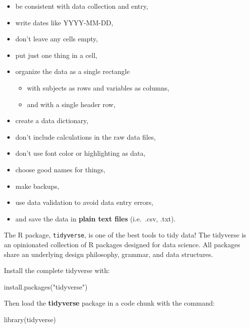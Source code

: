 \documentclass[
]{book}
\newenvironment{Shaded}{\begin{snugshade}}{\end{snugshade}}
\newcommand{\FunctionTok}[1]{\textcolor[rgb]{0.00,0.00,0.00}{#1}}
\newcommand{\NormalTok}[1]{#1}
\newcommand{\StringTok}[1]{\textcolor[rgb]{0.31,0.60,0.02}{#1}}
\providecommand{\tightlist}{%
  \setlength{\itemsep}{0pt}\setlength{\parskip}{0pt}}
\begin{document}
\begin{itemize}
\tightlist
\item
  be consistent with data collection and entry,
\item
  write dates like YYYY-MM-DD,
\item
  don't leave any cells empty,
\item
  put just one thing in a cell,
\item
  organize the data as a single rectangle

  \begin{itemize}
  \tightlist
  \item
    with subjects as rows and variables as columns,
  \item
    and with a single header row,
  \end{itemize}
\item
  create a data dictionary,
\item
  don't include calculations in the raw data files,
\item
  don't use font color or highlighting as data,
\item
  choose good names for things,
\item
  make backups,
\item
  use data validation to avoid data entry errors,
\item
  and save the data in \textbf{plain text files} (i.e.~.csv, .txt).
\end{itemize}

The R package, \texttt{tidyverse}, is one of the best tools to tidy data! The tidyverse is an opinionated collection of R packages designed for data science. All packages share an underlying design philosophy, grammar, and data structures.

Install the complete tidyverse with:

\begin{Shaded}
\begin{Highlighting}[]
\FunctionTok{install.packages}\NormalTok{(}\StringTok{"tidyverse"}\NormalTok{)}
\end{Highlighting}
\end{Shaded}

Then load the \textbf{tidyverse} package in a code chunk with the command:

\begin{Shaded}
\begin{Highlighting}[]
\FunctionTok{library}\NormalTok{(tidyverse)}
\end{Highlighting}
\end{Shaded}
\end{document}
